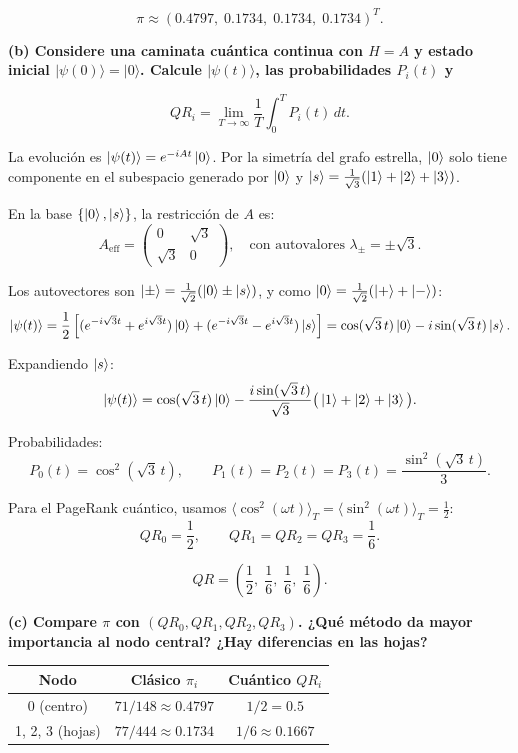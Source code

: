 $$
    \boxed{\pi \approx (0.4797,\; 0.1734,\; 0.1734,\; 0.1734)^T.}
$$

\vspace{0.5cm}

{\bfseries (b) Considere una caminata cuántica continua con $H=A$ y estado inicial $|\psi(0)\rangle = |0\rangle$. Calcule $|\psi(t)\rangle$, las probabilidades $P_i(t)$ y}

$$
    QR_i = \lim_{T\to\infty} \frac{1}{T} \int_0^T P_i(t)\,dt.
$$

La evolución es $\ket{\psi(t)} = e^{-iAt}\ket{0}$. Por la simetría del grafo estrella, $\ket{0}$ solo tiene componente en el subespacio generado por $\ket{0}$ y $\ket{s} = \frac{1}{\sqrt{3}}(\ket{1}+\ket{2}+\ket{3})$.

En la base $\{\ket{0}, \ket{s}\}$, la restricción de $A$ es:
$$
    A_{\text{eff}} = \begin{pmatrix} 0 & \sqrt{3} \\ \sqrt{3} & 0 \end{pmatrix}, \quad \text{con autovalores } \lambda_\pm = \pm\sqrt{3}.
$$

Los autovectores son $\ket{\pm} = \frac{1}{\sqrt{2}}(\ket{0} \pm \ket{s})$, y como $\ket{0} = \frac{1}{\sqrt{2}}(\ket{+}+\ket{-})$:
$$
    \ket{\psi(t)} = \frac{1}{2}\left[(e^{-i\sqrt{3}t}+e^{i\sqrt{3}t})\ket{0} + (e^{-i\sqrt{3}t}-e^{i\sqrt{3}t})\ket{s}\right] = \cos(\sqrt{3}\,t)\ket{0} - i\sin(\sqrt{3}\,t)\ket{s}.
$$

Expandiendo $\ket{s}$:
$$
    \ket{\psi(t)} = \cos(\sqrt{3}\,t)\ket{0} - \frac{i\sin(\sqrt{3}\,t)}{\sqrt{3}}\big(\ket{1}+\ket{2}+\ket{3}\big).
$$

Probabilidades:
$$
    P_0(t) = \cos^2(\sqrt{3}\,t), \qquad P_1(t) = P_2(t) = P_3(t) = \frac{\sin^2(\sqrt{3}\,t)}{3}.
$$

Para el PageRank cuántico, usamos $\langle \cos^2(\omega t)\rangle_T = \langle \sin^2(\omega t)\rangle_T = \tfrac{1}{2}$:
$$
    QR_0 = \frac{1}{2}, \qquad QR_1 = QR_2 = QR_3 = \frac{1}{6}.
$$

$$
    \boxed{QR = \left(\frac{1}{2},\; \frac{1}{6},\; \frac{1}{6},\; \frac{1}{6}\right).}
$$

\vspace{0.5cm}

{\bfseries (c) Compare $\pi$ con $(QR_0, QR_1, QR_2, QR_3)$. ¿Qué método da mayor importancia al nodo central? ¿Hay diferencias en las hojas?}

\begin{center}
    \begin{tabular}{c|c|c}
        Nodo            & Clásico $\pi_i$         & Cuántico $QR_i$      \\ \hline
        0 (centro)      & $71/148 \approx 0.4797$ & $1/2 = 0.5$          \\
        1, 2, 3 (hojas) & $77/444 \approx 0.1734$ & $1/6 \approx 0.1667$
    \end{tabular}
\end{center}

